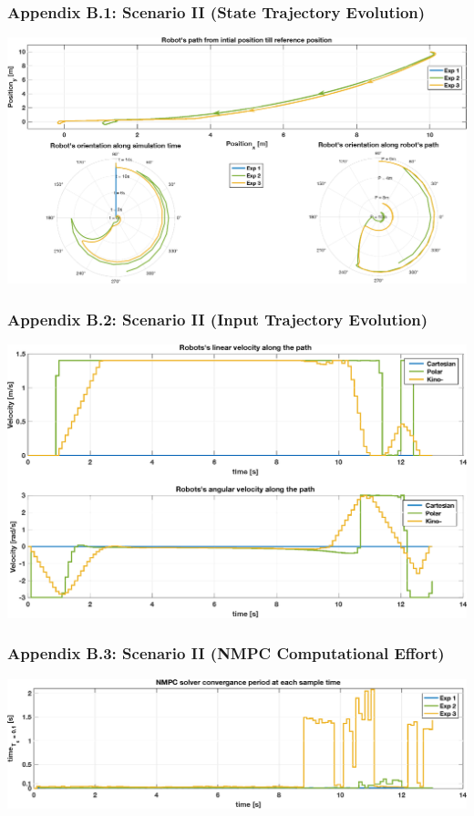  	\begin{frame}
 		\frametitle{Appendix B.1: Scenario \textrm{II} (State Trajectory Evolution)} \label{b.1}
		\centering
		\includegraphics[scale=0.44]{pictures/graphs/sn1_states_2.eps}
 	\end{frame}
 	
 	\begin{frame}
 		\frametitle{Appendix B.2: Scenario \textrm{II} (Input Trajectory Evolution)}\label{b.2}
 		\centering
 		\includegraphics[scale=0.42]{pictures/graphs/sn1_inputs_2.eps}
 	\end{frame}
 
	\begin{frame}
		\frametitle{Appendix B.3: Scenario \textrm{II} (NMPC Computational Effort)}\label{b.3}
		\centering
		\includegraphics[scale=0.42]{pictures/graphs/sn1_solver_time_2.eps}
	\end{frame}

